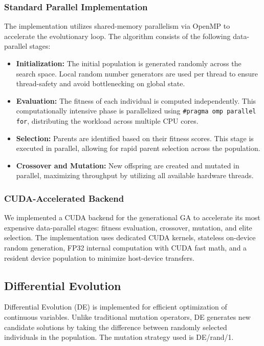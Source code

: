 \documentclass[conference]{IEEEtran}
\begin{document}
    \subsubsection{Standard Parallel Implementation}
    The implementation utilizes shared-memory parallelism via OpenMP to accelerate the evolutionary loop. The algorithm consists of the following data-parallel stages:
    \begin{itemize}
        \item \textbf{Initialization:} The initial population is generated randomly across the search space. Local random number generators are used per thread to ensure thread-safety and avoid bottlenecking on global state.
        \item \textbf{Evaluation:} The fitness of each individual is computed independently. This computationally intensive phase is parallelized using \texttt{\#pragma omp parallel for}, distributing the workload across multiple CPU cores.
        \item \textbf{Selection:} Parents are identified based on their fitness scores. This stage is executed in parallel, allowing for rapid parent selection across the population.
        \item \textbf{Crossover and Mutation:} New offspring are created and mutated in parallel, maximizing throughput by utilizing all available hardware threads.
    \end{itemize}

    \subsubsection{CUDA-Accelerated Backend}
    We implemented a CUDA backend for the generational GA to accelerate its most expensive data-parallel stages: fitness evaluation, crossover, mutation, and elite selection. The implementation uses dedicated CUDA kernels, stateless on-device random generation, FP32 internal computation with CUDA fast math, and a resident device population to minimize host-device transfers.

    \subsection{Differential Evolution}
    Differential Evolution (DE) is implemented for efficient optimization of continuous variables. Unlike traditional mutation operators, DE generates new candidate solutions by taking the difference between randomly selected individuals in the population. The mutation strategy used is DE/rand/1.
\end{document}
